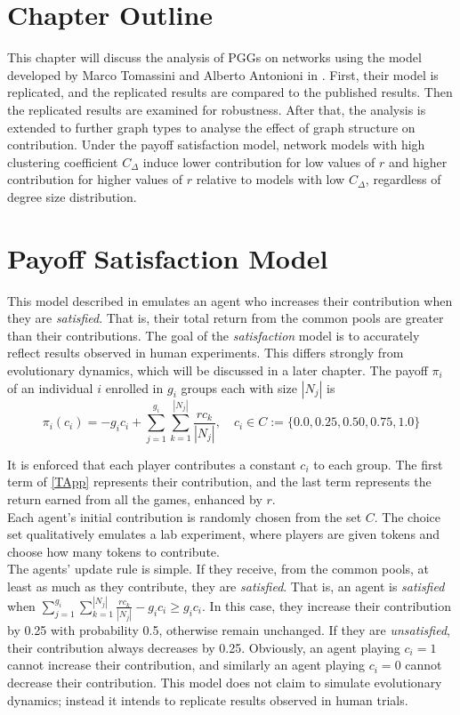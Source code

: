 

\section{Chapter Outline}
This chapter will discuss the analysis of PGGs on networks using the model developed by Marco Tomassini and Alberto Antonioni in \cite{RN49}. First, their model is replicated, and the replicated results are compared to the published results. Then the replicated results are examined for robustness. After that, the analysis is extended to further graph types to analyse the effect of graph structure on contribution. Under the payoff satisfaction model, network models with high clustering coefficient $C_\Delta$ induce lower contribution for low values of $r$ and higher contribution for higher values of $r$ relative to models with low $C_\Delta$, regardless of degree size distribution. 

\section{Payoff Satisfaction Model}
This model described in \cite{RN49} emulates an agent who increases their contribution when they are \emph{satisfied}. That is, their total return from the common pools are greater than their contributions. The goal of the \emph{satisfaction} model is to accurately reflect results observed in human experiments. This differs strongly from evolutionary dynamics, which will be discussed in a later chapter. The payoff $\pi_i$ of an individual $i$ enrolled in $g_i$ groups each with size $|N_j|$ is \\
\begin{equation}
    \pi_i(c_i) = - g_ic_i + \sum_{j=1}^{g_i} \sum_{k=1}^{|N_j|} \frac{rc_k}{|N_j|}, \quad c_i \in C:= \{0.0, 0.25, 0.50, 0.75, 1.0\} \label{TApp}
\end{equation}

It is enforced that each player contributes a constant $c_i$ to each group. The first term of \eqref{TApp} represents their contribution, and the last term represents the return earned from all the games, enhanced by $r$. \\

Each agent's initial contribution is randomly chosen from the set $C$. The choice set qualitatively emulates a lab experiment, where players are given tokens and choose how many tokens to contribute. \\

The agents' update rule is simple. If they receive, from the common pools, at least as much as they contribute, they are \emph{satisfied}. That is, an agent is \emph{satisfied} when $\sum_{j=1}^{g_i} \sum_{k=1}^{|N_j|} \frac{rc_k}{|N_j|} - g_i c_i\geq g_i c_i$. In this case, they increase their contribution by 0.25 with probability 0.5, otherwise remain unchanged. If they are \emph{unsatisfied}, their contribution always decreases by 0.25. Obviously, an agent playing $c_i =1$ cannot increase their contribution, and similarly an agent playing $c_i=0$ cannot decrease their contribution. This model does not claim to simulate evolutionary dynamics; instead it intends to replicate results observed in human trials. 


